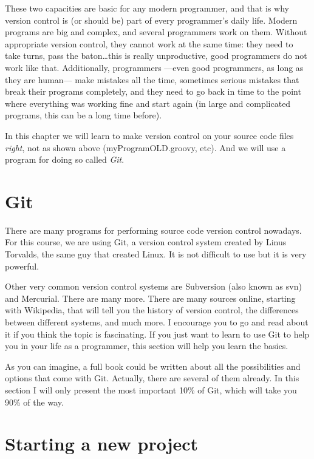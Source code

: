 These two capacities are basic for any modern programmer, and that is
why version control is (or should be) part of every programmer's daily
life. Modern programs are big and complex, and several programmers
work on them. Without appropriate version control, they cannot work at
the same time: they need to take turns, pass the baton\ldots this is
really unproductive, good programmers do not work like
that. Additionally, programmers ---even good programmers, as long as
they are human--- make mistakes all the time, sometimes serious
mistakes that break their programs completely, and they need to go
back in time to the point where everything was working fine and start
again (in large and complicated programs, this can be a long time
before).

In this chapter we will learn to make version control on your source
code files \emph{right}, not as shown above (myProgramOLD.groovy,
etc). And we will use a program for doing so called \emph{Git}.

\section{Git}
\label{sec:git}

There are many programs for performing source code version control
nowadays. For this course, we are using Git, a version control system
created by Linus Torvalds, the same guy that created Linux. It is not
difficult to use but it is very powerful. 

Other very common version control systems are Subversion (also known
as svn) and Mercurial. There are many more. There are many sources
online, starting with Wikipedia, that will tell you the history of
version control, the differences between different systems, and much
more. I encourage you to go and read about it if you think the topic
is fascinating. If you just want to learn to use Git to help you in
your life as a programmer, this section will help you learn the
basics. 

As you can imagine, a full book could be written about all the
possibilities and options that come with Git. Actually, there are
several of them already. In this section I will only present the most
important 10\% of Git, which will take you 90\% of the way. 

\section{Starting a new project}
\label{sec:starting-new-project}

